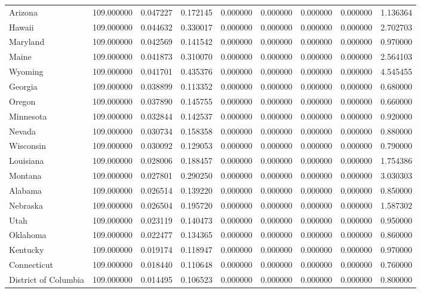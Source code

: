 \begin{tabular}{lrrrrrrrr}
Arizona & 109.000000 & 0.047227 & 0.172145 & 0.000000 & 0.000000 & 0.000000 & 0.000000 & 1.136364 \\
Hawaii & 109.000000 & 0.044632 & 0.330017 & 0.000000 & 0.000000 & 0.000000 & 0.000000 & 2.702703 \\
Maryland & 109.000000 & 0.042569 & 0.141542 & 0.000000 & 0.000000 & 0.000000 & 0.000000 & 0.970000 \\
Maine & 109.000000 & 0.041873 & 0.310070 & 0.000000 & 0.000000 & 0.000000 & 0.000000 & 2.564103 \\
Wyoming & 109.000000 & 0.041701 & 0.435376 & 0.000000 & 0.000000 & 0.000000 & 0.000000 & 4.545455 \\
Georgia & 109.000000 & 0.038899 & 0.113352 & 0.000000 & 0.000000 & 0.000000 & 0.000000 & 0.680000 \\
Oregon & 109.000000 & 0.037890 & 0.145755 & 0.000000 & 0.000000 & 0.000000 & 0.000000 & 0.660000 \\
Minnesota & 109.000000 & 0.032844 & 0.142537 & 0.000000 & 0.000000 & 0.000000 & 0.000000 & 0.920000 \\
Nevada & 109.000000 & 0.030734 & 0.158358 & 0.000000 & 0.000000 & 0.000000 & 0.000000 & 0.880000 \\
Wisconsin & 109.000000 & 0.030092 & 0.129053 & 0.000000 & 0.000000 & 0.000000 & 0.000000 & 0.790000 \\
Louisiana & 109.000000 & 0.028006 & 0.188457 & 0.000000 & 0.000000 & 0.000000 & 0.000000 & 1.754386 \\
Montana & 109.000000 & 0.027801 & 0.290250 & 0.000000 & 0.000000 & 0.000000 & 0.000000 & 3.030303 \\
Alabama & 109.000000 & 0.026514 & 0.139220 & 0.000000 & 0.000000 & 0.000000 & 0.000000 & 0.850000 \\
Nebraska & 109.000000 & 0.026504 & 0.195720 & 0.000000 & 0.000000 & 0.000000 & 0.000000 & 1.587302 \\
Utah & 109.000000 & 0.023119 & 0.140473 & 0.000000 & 0.000000 & 0.000000 & 0.000000 & 0.950000 \\
Oklahoma & 109.000000 & 0.022477 & 0.134365 & 0.000000 & 0.000000 & 0.000000 & 0.000000 & 0.860000 \\
Kentucky & 109.000000 & 0.019174 & 0.118947 & 0.000000 & 0.000000 & 0.000000 & 0.000000 & 0.970000 \\
Connecticut & 109.000000 & 0.018440 & 0.110648 & 0.000000 & 0.000000 & 0.000000 & 0.000000 & 0.760000 \\
District of Columbia & 109.000000 & 0.014495 & 0.106523 & 0.000000 & 0.000000 & 0.000000 & 0.000000 & 0.800000 \\

\end{tabular}
